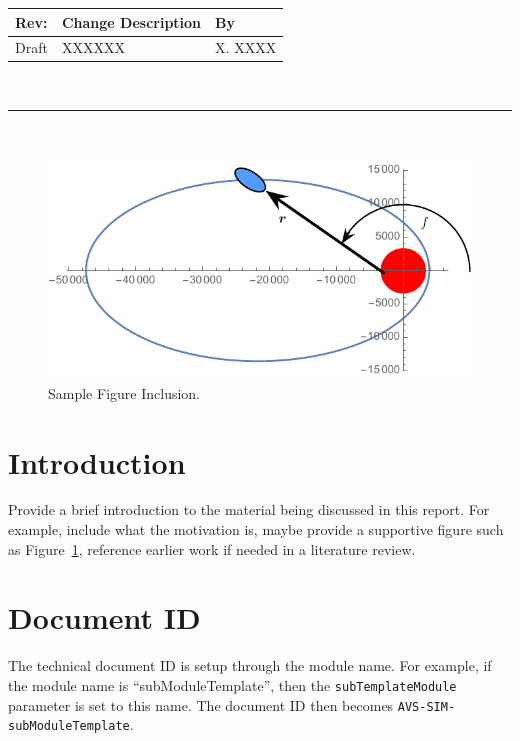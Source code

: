 \documentclass[]{BasiliskReportMemo}
\newcommand{\ModuleName}{subTemplateModule}
\begin{document}
\makeCover


%
%
\pagestyle{empty}
{\renewcommand{\arraystretch}{1.1}
\noindent
\begin{longtable}{|p{0.5in}|p{4.5in}|p{1.14in}|}
\hline
{\bfseries Rev}: & {\bfseries Change Description} & {\bfseries By} \\
\hline
Draft & XXXXXX & X. XXXX \\
\hline

\end{longtable}
}

\newpage
\setcounter{page}{1}
\pagestyle{fancy}

\tableofcontents
~\\ \hrule ~\\

\begin{figure}[htb]
	\centerline{
	\includegraphics[]{Figures/Fig1}
	}
	\caption{Sample Figure Inclusion.}
	\label{fig:Fig1}
\end{figure}

\section{Introduction}
Provide a brief introduction to the material being discussed in this report.  For example, include what the motivation is, maybe provide a supportive figure such as Figure~\ref{fig:Fig1}, reference earlier work if needed in a literature review.


\section{Document ID}
The technical document ID is setup through the module name.  For example, if the module name is ``subModuleTemplate'', then the  {\tt \ModuleName} parameter is set to this name.  The document ID then becomes {\tt AVS-SIM-subModuleTemplate}.  
\end{document}
